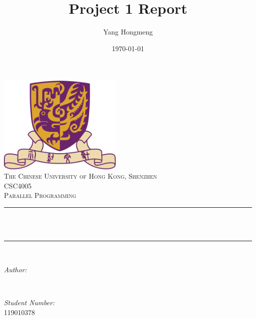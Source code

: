 \title{Project 1 Report} %
\author{Yang Hongmeng}%
\date{\today}%





\begin{titlepage}
    \centering
    \vspace*{0.5 cm}
    \includegraphics[scale = 0.75,width=6cm]{CUHK}\\[1.0 cm]   %
    \textsc{\large The Chinese University of Hong Kong, Shenzhen}\\[2.0 cm] 
    \textsc{\Large CSC4005}\\[0.5 cm] 
    \textsc{\large Parallel Programming}\\[0.5 cm]               %
    \rule{\linewidth}{0.2 mm} \\[0.4 cm]
    { \huge \bfseries \thetitle}\\
    \rule{\linewidth}{0.2 mm} \\[1.5 cm]
    
    \begin{minipage}{0.4\textwidth}
        \begin{flushleft} \large
            \emph{Author:}\\
            \theauthor
            \end{flushleft}
    \end{minipage}~
    \begin{minipage}{0.4\textwidth}
            \begin{flushleft} \large
            \emph{Student Number:} \\
             119010378  %
        \end{flushleft}
    \end{minipage}\\[2 cm]
    {\large \thedate}\\[2 cm]
 
    \vfill
    
\end{titlepage}
\tableofcontents
\pagebreak
\rmfamily

